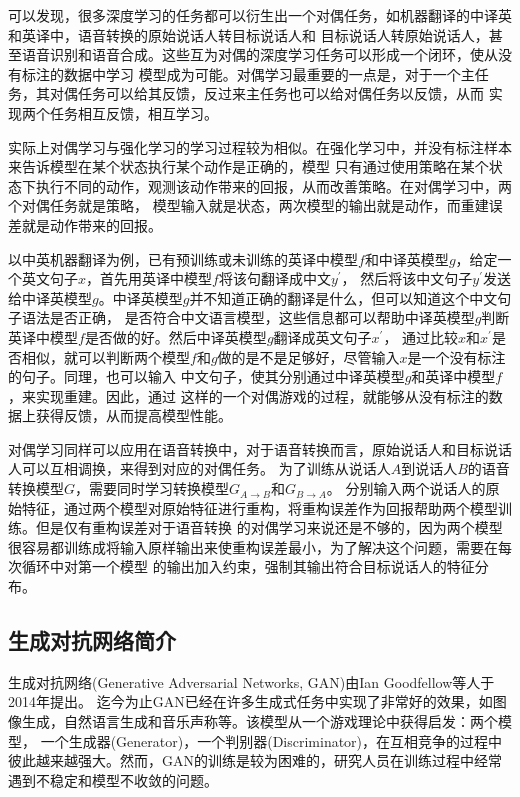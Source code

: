可以发现，很多深度学习的任务都可以衍生出一个对偶任务，如机器翻译的中译英和英译中，语音转换的原始说话人转目标说话人和
目标说话人转原始说话人，甚至语音识别和语音合成。这些互为对偶的深度学习任务可以形成一个闭环，使从没有标注的数据中学习
模型成为可能。对偶学习最重要的一点是，对于一个主任务，其对偶任务可以给其反馈，反过来主任务也可以给对偶任务以反馈，从而
实现两个任务相互反馈，相互学习。

实际上对偶学习与强化学习的学习过程较为相似。在强化学习中，并没有标注样本来告诉模型在某个状态执行某个动作是正确的，模型
只有通过使用策略在某个状态下执行不同的动作，观测该动作带来的回报，从而改善策略。在对偶学习中，两个对偶任务就是策略，
模型输入就是状态，两次模型的输出就是动作，而重建误差就是动作带来的回报。

以中英机器翻译为例，已有预训练或未训练的英译中模型$f$和中译英模型$g$，给定一个英文句子$x$，首先用英译中模型$f$将该句翻译成中文$y^{'}$，
然后将该中文句子$y^{'}$发送给中译英模型$g$。中译英模型$g$并不知道正确的翻译是什么，但可以知道这个中文句子语法是否正确，
是否符合中文语言模型，这些信息都可以帮助中译英模型$g$判断英译中模型$f$是否做的好。然后中译英模型$g$翻译成英文句子$x^{'}$，
通过比较$x$和$x^{'}$是否相似，就可以判断两个模型$f$和$g$做的是不是足够好，尽管输入$x$是一个没有标注的句子。同理，也可以输入
中文句子，使其分别通过中译英模型$g$和英译中模型$f$，来实现重建。因此，通过
这样的一个对偶游戏的过程，就能够从没有标注的数据上获得反馈，从而提高模型性能。

对偶学习同样可以应用在语音转换中，对于语音转换而言，原始说话人和目标说话人可以互相调换，来得到对应的对偶任务。
为了训练从说话人$A$到说话人$B$的语音转换模型$G$，需要同时学习转换模型$G_{A\rightarrow B}$和$G_{B\rightarrow A}$。
分别输入两个说话人的原始特征，通过两个模型对原始特征进行重构，将重构误差作为回报帮助两个模型训练。但是仅有重构误差对于语音转换
的对偶学习来说还是不够的，因为两个模型很容易都训练成将输入原样输出来使重构误差最小，为了解决这个问题，需要在每次循环中对第一个模型
的输出加入约束，强制其输出符合目标说话人的特征分布。

\subsection{生成对抗网络简介}
生成对抗网络(Generative Adversarial Networks, GAN)由Ian Goodfellow等人于2014年提出\cite{goodfellow2014generative}。
迄今为止GAN已经在许多生成式任务中实现了非常好的效果，如图像生成，自然语言生成和音乐声称等。该模型从一个游戏理论中获得启发：两个模型，
一个生成器(Generator)，一个判别器(Discriminator)，在互相竞争的过程中彼此越来越强大。然而，GAN的训练是较为困难的，研究人员在训练过程中经常遇到不稳定和模型不收敛的问题。

